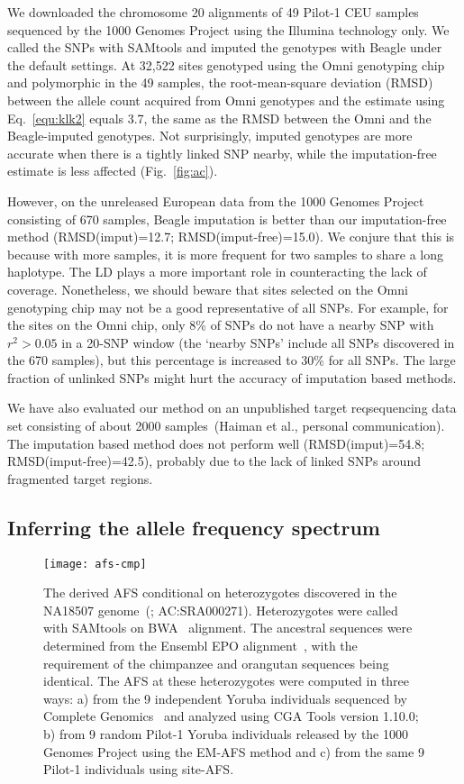 \documentclass{bioinfo}
\begin{document}
We downloaded the chromosome 20 alignments of 49 Pilot-1 CEU samples sequenced
by the 1000 Genomes Project using the Illumina technology only. We called the
SNPs with SAMtools and imputed the genotypes with Beagle under the default
settings. At 32,522 sites genotyped using the Omni genotyping chip and
polymorphic in the 49 samples, the root-mean-square deviation (RMSD) between
the allele count acquired from Omni genotypes and the estimate using
Eq.~\eqref{equ:klk2} equals 3.7, the same as the RMSD between the Omni and the
Beagle-imputed genotypes.  Not surprisingly, imputed genotypes are more
accurate when there is a tightly linked SNP nearby, while the imputation-free
estimate is less affected (Fig.~\ref{fig:ac}).

However, on the unreleased European data from the 1000 Genomes Project
consisting of 670 samples, Beagle imputation is better than our imputation-free
method (RMSD(imput)=12.7; RMSD(imput-free)=15.0).  We conjure that this is
because with more samples, it is more frequent for two samples to share
a long haplotype.  The LD plays a more important role in counteracting the lack
of coverage.  Nonetheless, we should beware that sites selected on the Omni
genotyping chip may not be a good representative of all SNPs. For example, for
the sites on the Omni chip, only 8\% of SNPs do not have a nearby SNP with
$r^2>0.05$ in a 20-SNP window (the `nearby SNPs' include all SNPs discovered in
the 670 samples), but this percentage is increased to 30\% for all SNPs.  The
large fraction of unlinked SNPs might hurt the accuracy of imputation based
methods.

We have also evaluated our method on an unpublished target reqsequencing data
set consisting of about 2000 samples~(Haiman et al., personal communication).
The imputation based method does not perform well (RMSD(imput)=54.8;
RMSD(imput-free)=42.5), probably due to the lack of linked SNPs around
fragmented target regions.

\subsection{Inferring the allele frequency spectrum}
\begin{figure}[tb]
\centering
\texttt{[image: afs-cmp]}
\caption{The derived AFS conditional on heterozygotes discovered in the NA18507
genome~(\citealp{Bentley:2008cr}; AC:SRA000271). Heterozygotes were called with SAMtools on
BWA~\citep{Li:2009uq} alignment.  The ancestral sequences were
determined from the Ensembl EPO alignment~\citep{Paten:2008uq}, with the requirement of the
chimpanzee and orangutan sequences being identical.  The AFS at these heterozygotes were
computed in three ways: a) from the 9 independent Yoruba individuals sequenced by Complete
Genomics~\citep{Drmanac:2010ly} and analyzed using CGA Tools version 1.10.0; b)
from 9 random Pilot-1 Yoruba individuals released by the 1000 Genomes Project
using the EM-AFS method and c) from the same 9 Pilot-1 individuals using
site-AFS.}\label{fig:afs}
\end{figure}
\end{document}
